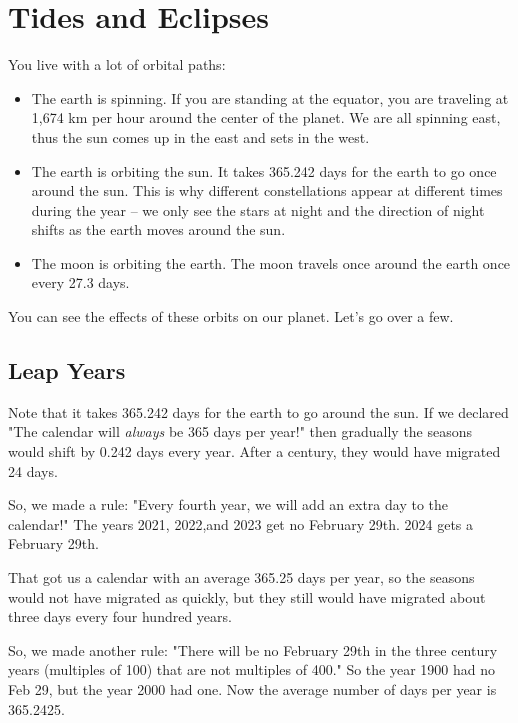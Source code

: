 \chapter{Tides and Eclipses}

You live with a lot of orbital paths:
\begin{itemize}

\item The earth is spinning.  If you are standing at the equator,  you are traveling at 1,674 km per hour around the center of the planet.  We are all spinning east,  thus the sun comes up in the east and sets in the west.

\item  The earth is orbiting the sun.    It takes 365.242 days for the earth to go once around the sun.  This is why different constellations appear at different times during the year -- we only see the stars at night and the direction of night shifts as the earth moves around the sun.  

\item The moon is orbiting the earth.   The moon travels once around the earth once every 27.3 days.  

\end{itemize}

You can see the effects of these orbits on our planet.  Let's go over a few.

\section{Leap Years}

Note that it takes 365.242 days for the earth to go around the sun.  If we declared "The calendar will \emph{always} be 365 days per year!"  then gradually the seasons would shift by 0.242 days every year.  After a century,  they would have migrated 24 days.

So, we made a rule: "Every fourth year,  we will add an extra day to the calendar!"  The years 2021, 2022,and 2023 get no February 29th.  2024 gets a February 29th.

That got us a calendar with an average 365.25 days per year, so the seasons would not have migrated as quickly,  but they still would have migrated about three days every four hundred years.

So, we made another rule: "There will be no February 29th in the three century years (multiples of 100) that are not multiples of 400."  So the year 1900 had no Feb 29,  but the year 2000 had one.   Now the average number of days per year is 365.2425.


